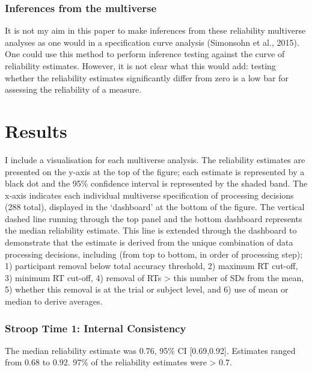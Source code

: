 \documentclass[
  man,floatsintext]{apa6}
\begin{document}
\hypertarget{inferences-from-the-multiverse}{%
\subsubsection{Inferences from the multiverse}\label{inferences-from-the-multiverse}}

It is not my aim in this paper to make inferences from these reliability multiverse analyses as one would in a specification curve analysis (Simonsohn et al., 2015). One could use this method to perform inference testing against the curve of reliability estimates. However, it is not clear what this would add: testing whether the reliability estimates significantly differ from zero is a low bar for assessing the reliability of a measure.

\hypertarget{results}{%
\section{Results}\label{results}}

I include a visualisation for each multiverse analysis. The reliability estimates are presented on the y-axis at the top of the figure; each estimate is represented by a black dot and the 95\% confidence interval is represented by the shaded band. The x-axis indicates each individual multiverse specification of processing decisions (288 total), displayed in the `dashboard' at the bottom of the figure. The vertical dashed line running through the top panel and the bottom dashboard represents the median reliability estimate. This line is extended through the dashboard to demonstrate that the estimate is derived from the unique combination of data processing decisions, including (from top to bottom, in order of processing step); 1) participant removal below total accuracy threshold, 2) maximum RT cut-off, 3) minimum RT cut-off, 4) removal of RTs \textgreater{} this number of SDs from the mean, 5) whether this removal is at the trial or subject level, and 6) use of mean or median to derive averages.

\newpage

\hypertarget{stroop-time-1-internal-consistency}{%
\subsubsection{Stroop Time 1: Internal Consistency}\label{stroop-time-1-internal-consistency}}

The median reliability estimate was 0.76, 95\% CI {[}0.69,0.92{]}. Estimates ranged from 0.68 to 0.92. 97\% of the reliability estimates were \textgreater{} 0.7.
\end{document}
